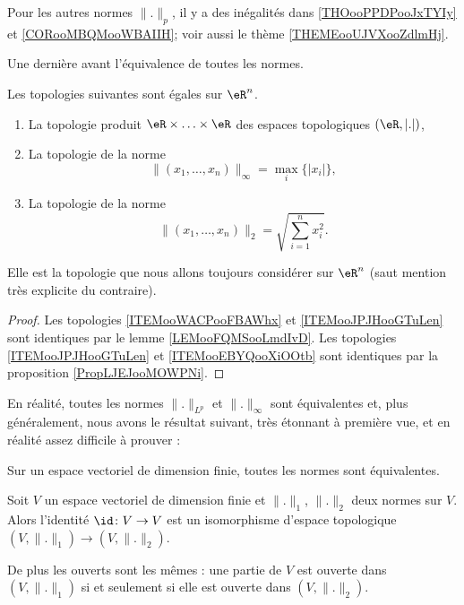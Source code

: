 Pour les autres normes \( \| . \|_p\), il y a des inégalités dans \ref{THOooPPDPooJxTYIy} et \ref{CORooMBQMooWBAIIH}; voir aussi le thème \ref{THEMEooUJVXooZdlmHj}.


Une dernière avant l'équivalence de toutes les normes.
\begin{propositionDef}
    Les topologies suivantes sont égales sur \( \eR^n\).
    \begin{enumerate}
        \item       \label{ITEMooWACPooFBAWhx}
            La topologie produit \( \eR\times \ldots\times \eR\) des espaces topologiques \( (\eR,| . |)\),
        \item       \label{ITEMooJPJHooGTuLen}
            La topologie de la norme
            \begin{equation}
                \| (x_1,\ldots, x_n) \|_{\infty}=\max_i\{ | x_i | \},
            \end{equation}
        \item       \label{ITEMooEBYQooXiOOtb}
            La topologie de la norme
            \begin{equation}
                \| (x_1,\ldots, x_n) \|_2=\sqrt{ \sum_{i=1}^nx_i^2 }.
            \end{equation}
    \end{enumerate}
    Elle est la topologie que nous allons toujours considérer sur \( \eR^n\) (saut mention très explicite du contraire).
\end{propositionDef}

\begin{proof}
    Les topologies \ref{ITEMooWACPooFBAWhx} et \ref{ITEMooJPJHooGTuLen} sont identiques par le lemme \ref{LEMooFQMSooLmdIvD}. Les topologies \ref{ITEMooJPJHooGTuLen} et \ref{ITEMooEBYQooXiOOtb} sont identiques par la proposition \ref{PropLJEJooMOWPNi}.
\end{proof}

En réalité, toutes les normes \( \| . \|_{L^p}\) et \( \| . \|_{\infty}\) sont équivalentes et, plus généralement, nous avons le résultat suivant, très étonnant à première vue, et en réalité assez difficile à prouver :
\begin{theorem}		\label{ThoNormesEquiv}
	Sur un espace vectoriel de dimension finie, toutes les normes sont équivalentes.
\end{theorem}

\begin{corollary}       \label{CORooBRDYooLmGJDE}
    Soit \( V\) un espace vectoriel de dimension finie et \( \| . \|_1\), \( \| . \|_2\) deux normes sur \( V\). Alors l'identité \( \id\colon V\to V\) est un isomorphisme d'espace topologique \( (V,\| . \|_1)\to (V,\| . \|_2)\).

    De plus les ouverts sont les mêmes : une partie de \( V\) est ouverte dans \( (V,\| . \|_1)\) si et seulement si elle est ouverte dans \( (V,\| . \|_2)\).
\end{corollary}

